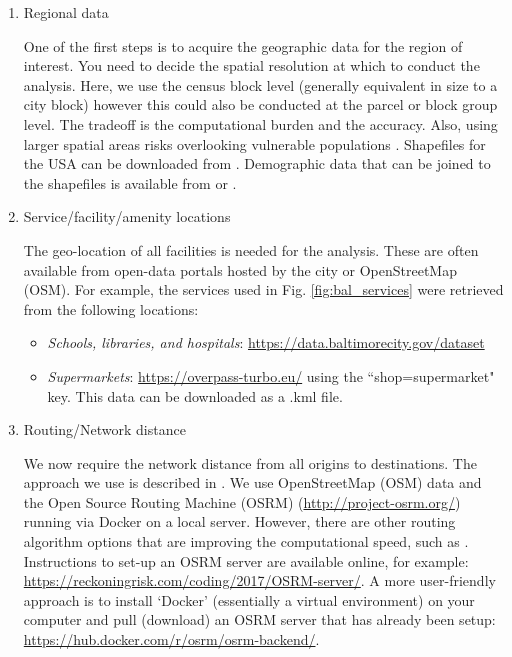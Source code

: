 \documentclass[onecolumn,doublespacing]{risa}
\let \citeA \textcite
\let \cite \parencite
\begin{document}
\begin{enumerate}[listparindent=0em, parsep=0.5em,itemindent=0em]
    \item Regional data

    One of the first steps is to acquire the geographic data for the region of interest. 
    You need to decide the spatial resolution at which to conduct the analysis. 
    Here, we use the census block level (generally equivalent in size to a city block) however this could also be conducted at the parcel or block group level. 
    The tradeoff is the computational burden and the accuracy.
    Also, using larger spatial areas risks overlooking vulnerable populations \cite{Logan2017-fr}.
    Shapefiles for the USA can be downloaded from \cite{Manson2018-ug}.
    Demographic data that can be joined to the shapefiles is available from \citeA{Manson2018-ug} or \citeA{US_Census_Bureau2017-ti}.
    
    \item Service/facility/amenity locations
    
    The geo-location of all facilities is needed for the analysis.
    These are often available from open-data portals hosted by the city or OpenStreetMap (OSM).
    For example, the services used in Fig. \ref{fig:bal_services} were retrieved from the following locations:
    \begin{itemize}
        \item \textit{Schools, libraries, and hospitals}: \url{https://data.baltimorecity.gov/dataset}
        \item \textit{Supermarkets}: \url{https://overpass-turbo.eu/} using the ``shop=supermarket" key. This data can be downloaded as a .kml file.
    \end{itemize}
    
    \item Routing/Network distance
    
    We now require the network distance from all origins to destinations.
    The approach we use is described in \cite{Logan2017-fr}.
    We use OpenStreetMap (OSM) data and the Open Source Routing Machine (OSRM) \cite{luxen-vetter-2011} (\url{http://project-osrm.org/}) running via Docker \cite{Merkel2014-op} on a local server.
    However, there are other routing algorithm options that are improving the computational speed, such as \citeA{noel2019-pypi}.
    Instructions to set-up an OSRM server are available online, for example: \url{https://reckoningrisk.com/coding/2017/OSRM-server/}.
    A more user-friendly approach is to install `Docker' (essentially a virtual environment) on your computer and pull (download) an OSRM server that has already been setup: \url{https://hub.docker.com/r/osrm/osrm-backend/}.
    

\end{enumerate}
\end{document}
